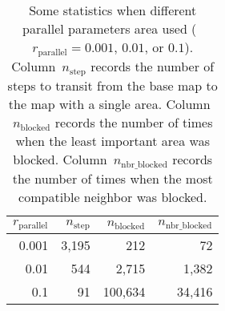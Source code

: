 \documentclass[ijgi,article,submit,moreauthors,pdftex]{Definitions/mdpi}
\begin{document}
\begin{table}[tb]
\centering
\caption{Some statistics when different parallel parameters area used 
    (\ie~$r_\mathrm{parallel}=0.001$, $0.01$, or $0.1$).
    Column~$n_\mathrm{step}$ records the number of steps to transit 
    from the base map to the map with a single area.    
    Column~$n_\mathrm{blocked}$ records the number of times
    when the least important area was blocked.
    Column~$n_\mathrm{nbr\_blocked}$ records the number of times 
    when the most compatible neighbor was blocked.
}
\begin{tabular}{rrrr}
\toprule
$r_\mathrm{parallel}$   & $n_\mathrm{step}$ & $n_\mathrm{blocked}$  & $n_\mathrm{nbr\_blocked}$ \\ \midrule
0.001                   &  3{,}195          &       212             &       72                  \\
0.01                    &  544              &   2{,}715             &  1{,}382                  \\
0.1                     &  91               & 100{,}634             & 34{,}416                  \\ 
\bottomrule 
\end{tabular}
\label{tbl:parallel_param_comparison}
\end{table}
\end{document}
